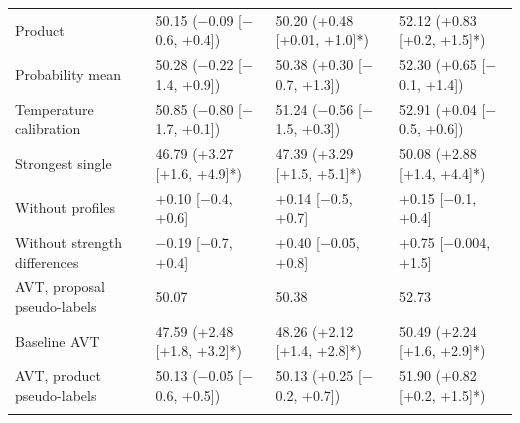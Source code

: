 \documentclass[sn-nature,pdflatex]{sn-jnl}
\begin{document}
\begin{table}[!htbp]
\begin{tabular}{@{}p{2.2cm}lll@{}}
Product & 50.15 ($-$0.09 [$-$0.6, +0.4]) & 50.20 (+0.48 [+0.01, +1.0]*) & 52.12 (+0.83 [+0.2, +1.5]*) \\
Probability mean & 50.28 ($-$0.22 [$-$1.4, +0.9]) & 50.38 (+0.30 [$-$0.7, +1.3]) & 52.30 (+0.65 [$-$0.1, +1.4]) \\
Temperature calibration & 50.85 ($-$0.80 [$-$1.7, +0.1]) & 51.24 ($-$0.56 [$-$1.5, +0.3]) & 52.91 (+0.04 [$-$0.5, +0.6]) \\
Strongest single & 46.79 (+3.27 [+1.6, +4.9]*) & 47.39 (+3.29 [+1.5, +5.1]*) & 50.08 (+2.88 [+1.4, +4.4]*) \\
Without profiles & +0.10 [$-$0.4, +0.6] & +0.14 [$-$0.5, +0.7] & +0.15 [$-$0.1, +0.4] \\
Without strength differences & $-$0.19 [$-$0.7, +0.4] & +0.40 [$-$0.05, +0.8] & +0.75 [$-$0.004, +1.5] \\
AVT, proposal pseudo-labels & 50.07 & 50.38 & 52.73 \\
Baseline AVT & 47.59 (+2.48 [+1.8, +3.2]*) & 48.26 (+2.12 [+1.4, +2.8]*) & 50.49 (+2.24 [+1.6, +2.9]*) \\
AVT, product pseudo-labels & 50.13 ($-$0.05 [$-$0.6, +0.5]) & 50.13 (+0.25 [$-$0.2, +0.7]) & 51.90 (+0.82 [+0.2, +1.5]*) \\
\botrule\end{tabular}
\end{table}


\end{document}
